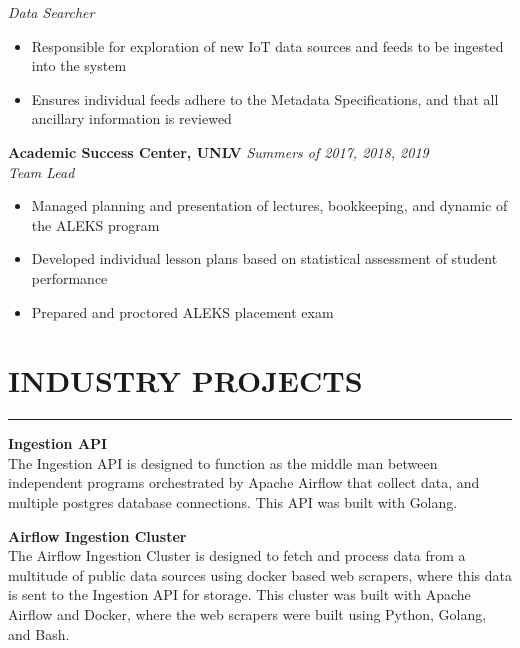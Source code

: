 \documentclass{res}
\begin{document}
\begin{resume}
			\emph{Data Searcher}

			\begin{itemize} \itemsep -2pt
				\item Responsible for exploration of new IoT data sources and feeds to be ingested into the system
				\item Ensures individual feeds adhere to the Metadata Specifications, and that all ancillary information is reviewed
			\end{itemize} \vspace{-2mm}

		{\bf Academic Success Center, UNLV} \hfill \emph{Summers of 2017, 2018, 2019} \\
			\emph{Team Lead}

			\begin{itemize} \itemsep -2pt
				\item Managed planning and presentation of lectures, bookkeeping, and dynamic of the ALEKS program
				\item Developed individual lesson plans based on statistical assessment of student performance
        \item Prepared and proctored ALEKS placement exam
			\end{itemize}

\vspace{-3pt}

		\section{{INDUSTRY PROJECTS}}
    \noindent\rule[0.5ex]{\linewidth}{1pt}
		{\bf Ingestion API} \hfill \vspace{5pt} \\
			The Ingestion API is designed to function as the middle man between independent programs orchestrated by Apache Airflow that collect data, and multiple postgres database connections. This API was built with Golang.
\vspace{-5pt}

		{\bf Airflow Ingestion Cluster} \hfill \vspace{5pt} \\
			The Airflow Ingestion Cluster is designed to fetch and process data from a multitude of public data sources using docker based web scrapers, where this data is sent to the Ingestion API for storage. This cluster was built with Apache Airflow and Docker, where the web scrapers were built using Python, Golang, and Bash.
\vspace{-5pt}


\end{resume}
\end{document}
